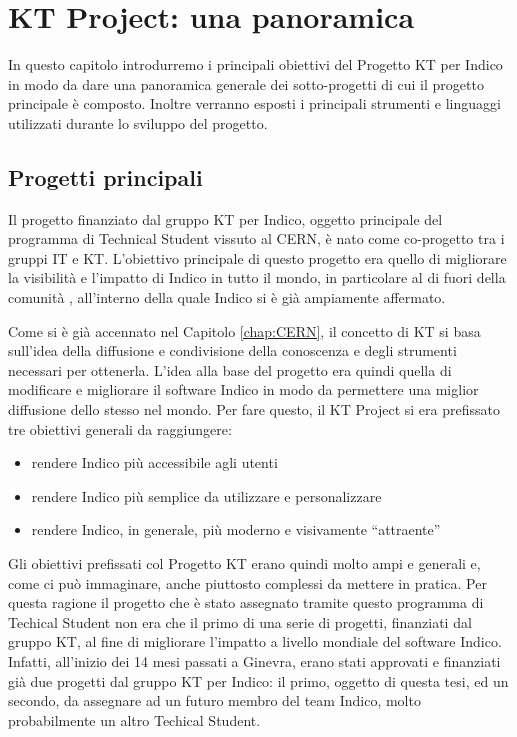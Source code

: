 \chapter{KT Project: una panoramica} \label{chap:panoramica}

	In questo capitolo introdurremo i principali obiettivi del Progetto KT per Indico in modo da dare una panoramica generale dei sotto-progetti di cui il progetto principale è composto. Inoltre verranno esposti i principali strumenti e linguaggi utilizzati durante lo sviluppo del progetto.
	
	\section{Progetti principali} \label{sec:p;progetti_principali}
    	
    	Il progetto finanziato dal gruppo \ac{KT} per Indico, oggetto principale del programma di Technical Student vissuto al \ac{CERN}, è nato come co-progetto tra i gruppi \ac{IT} e \ac{KT}. L'obiettivo principale di questo progetto era quello di migliorare la visibilità e l'impatto di Indico in tutto il mondo, in particolare al di fuori della comunità , all'interno della quale Indico si è già ampiamente affermato.
    	
    	Come si è già accennato nel Capitolo \ref{chap:CERN}, il concetto di \ac{KT} si basa sull'idea della diffusione e condivisione della conoscenza e degli strumenti necessari per ottenerla. L'idea alla base del progetto era quindi quella di modificare e migliorare il software Indico in modo da permettere una miglior diffusione dello stesso nel mondo. Per fare questo, il KT Project si era prefissato tre obiettivi generali da raggiungere:
    	
    	\begin{itemize}
        	\item rendere Indico più accessibile agli utenti
        	\item rendere Indico più semplice da utilizzare e personalizzare
        	\item rendere Indico, in generale, più moderno e visivamente ``attraente''
    	\end{itemize}
    	
    	Gli obiettivi prefissati col Progetto KT erano quindi molto ampi e generali e, come ci può immaginare, anche piuttosto complessi da mettere in pratica. Per questa ragione il progetto che è stato assegnato tramite questo programma di Techical Student non era che il primo di una serie di progetti, finanziati dal gruppo \ac{KT}, al fine di migliorare l'impatto a livello mondiale del software Indico. Infatti, all'inizio dei 14 mesi passati a Ginevra, erano stati approvati e finanziati già due progetti dal gruppo \ac{KT} per Indico: il primo, oggetto di questa tesi, ed un secondo, da assegnare ad un futuro membro del team Indico, molto probabilmente un altro Techical Student.
    	
